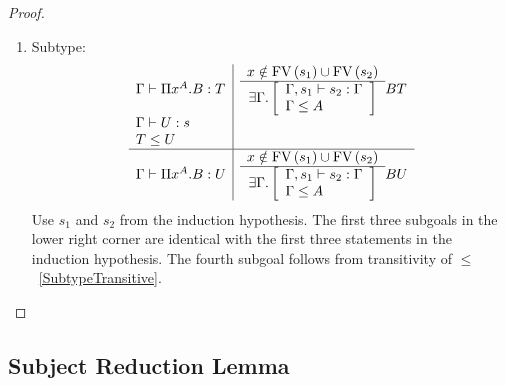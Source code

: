\begin{theorem}
\begin{proof}
{\begin{enumerate}
\begin{enumerate}
                \item Subtype:
                $$
                \begin{array}{l|l}
                    \Gamma \vdash \Pi x^A.B : T
                    &
                    \begin{array}{c}  x \notin \text{FV}\, (s_1) \cup \text{FV}\, (s_2)  \\ \hline  \exists \Gamma. \left[ \begin{array}{l} \Gamma,s_1 \vdash s_2 : \Gamma \\ \Gamma \le A \end{array} \right] \end{array} B T
                    \\
                    \Gamma \vdash U: s
                    \\
                    T \le U
                    \\
                    \hline
                    \Gamma \vdash \Pi x^A.B : U
                    &
                    \begin{array}{c}  x \notin \text{FV}\, (s_1) \cup \text{FV}\, (s_2)  \\ \hline  \exists \Gamma. \left[ \begin{array}{l} \Gamma,s_1 \vdash s_2 : \Gamma \\ \Gamma \le A \end{array} \right] \end{array} B U
                \end{array}
                $$
                Use $s_1$ and $s_2$ from the induction hypothesis. The first
                    three subgoals in the lower right corner are identical with
                    the first three statements in the induction hypothesis. The
                    fourth subgoal follows from transitivity of
                    $\le$~\ref{SubtypeTransitive}.
            \end{enumerate}
        \end{enumerate}
        }
    \end{proof}
\end{theorem}





\subsection{Subject Reduction Lemma}

